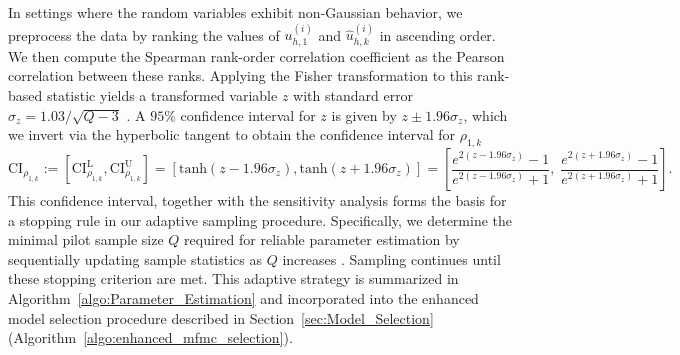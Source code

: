 In settings where the random variables exhibit non-Gaussian behavior, we preprocess the data by ranking the values of $u_{h,1}^{(i)}$ and $\widehat{u}_{h,k}^{(i)}$ in ascending order. We then compute the Spearman rank-order correlation coefficient as the Pearson correlation between these ranks. Applying the Fisher transformation to this rank-based statistic yields a transformed variable $z$ with standard error $\sigma_z = 1.03/\sqrt{Q - 3}$ \cite{BiHi:2017, FiHaPe:1957}. A $95\%$ confidence interval for $z$ is given by $z \pm 1.96\sigma_z$, which we invert via the hyperbolic tangent to obtain the confidence interval for $\rho_{1,k}$
%
\begin{equation}
\label{eq:Confidence_Interval_rho}
    \text{CI}_{\rho_{1,k}} := \left[\text{CI}_{\rho_{1,k}}^{\text{L}},\text{CI}_{\rho_{1,k}}^{\text{U}}\right] = \left[\text{tanh}(z - 1.96\sigma_{z}),\text{tanh}(z + 1.96\sigma_{z})\right] = \left[\frac{e^{2(z - 1.96\sigma_{z})}-1}{e^{2(z - 1.96\sigma_{z})}+1},\; \frac{e^{2(z + 1.96\sigma_{z})}-1}{e^{2(z + 1.96\sigma_{z})}+1}\right].
\end{equation}
%
This confidence interval, together with the sensitivity analysis forms the basis for a stopping rule in our adaptive sampling procedure. Specifically, we determine the minimal pilot sample size $Q$ required for reliable parameter estimation by sequentially updating sample statistics as $Q$ increases \cite{La:2001,Wa:1947}. Sampling continues until these stopping criterion are met. This adaptive strategy is summarized in Algorithm~\ref{algo:Parameter_Estimation} and incorporated into the enhanced model selection procedure described in Section~\ref{sec:Model_Selection} (Algorithm~\ref{algo:enhanced_mfmc_selection}).

